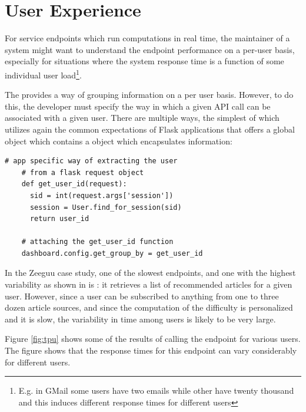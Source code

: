 \documentclass[conference]{IEEEtran}
\begin{document}
\newpage
\section {User Experience}
\label{sec:user}

  For service endpoints which run computations in real time, the maintainer of a system might want to understand the endpoint performance on a per-user basis, especially for situations where the system response time is a function of some individual user load\footnote{E.g. in GMail some users have two emails while other have twenty thousand and this induces different response times for different users}.

  The \tool provides a way of grouping information on a per user basis. However, to do this, the developer must specify the way in which a given API call can be associated with a given user. There are multiple ways, the simplest of which utilizes again the common expectations of Flask applications that offers a global  object which contains a  object which encapsulates information: 

  \begin{lstlisting}[style=custompython]  
    # app specific way of extracting the user
    # from a flask request object    
    def get_user_id(request):
      sid = int(request.args['session'])
      session = User.find_for_session(sid)
      return user_id

    # attaching the get_user_id function
    dashboard.config.get_group_by = get_user_id

  \end{lstlisting}

  In the Zeeguu case study, one of the slowest endpoints, and one with the highest variability as shown in  is \epFeedItems: it retrieves a list of recommended articles for a given user. However, since a user can be subscribed to anything from one to three dozen article sources, and since the computation of the difficulty is personalized and it is slow, the variability in time among users is likely to be very large. 


  Figure \ref{fig:tpu} shows some of the results of calling the \epFeedItems endpoint for various users. The figure shows that the response times for this endpoint can vary considerably for different users. 
\end{document}
